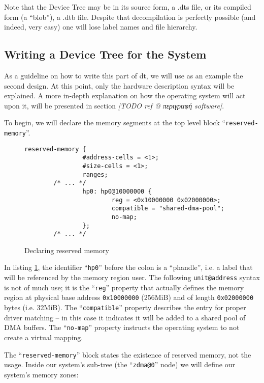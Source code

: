 Note that the Device Tree may be in its source form, 
a .dts file, or its compiled form (a ``blob''), a .dtb file.
Despite that decompilation is perfectly possible (and indeed, very easy)
one will lose label names and file hierarchy.

\subsection{Writing a Device Tree for the System}

As a guideline on how to write this part of \gls{dt}, we will use as an example the second design.
At this point, only the hardware description syntax will be explained.
A more in-depth explanation on how the operating system will act upon it,
will be presented in section \emph{[TODO ref @ περιγραφή software]}.

To begin, we will declare the memory segments at the top level block ``\texttt{reserved-memory}''.

\begin{figure}[ht!]
\centering
\begin{lstlisting}[style=basic]
        reserved-memory {
                #address-cells = <1>;
                #size-cells = <1>;
                ranges;
		/* ... */
                hp0: hp0@10000000 {
                        reg = <0x10000000 0x02000000>;
                        compatible = "shared-dma-pool";
                        no-map;
                };
		/* ... */
\end{lstlisting}
\caption{Declaring reserved memory}
\label{list:resmem}
\end{figure}

In listing \ref{list:resmem}, the identifier ``\texttt{hp0}'' before the colon is a ``phandle'', 
i.e. a label that will be referenced by
the memory region user. The following \texttt{unit@address} syntax is not of much use;
it is the ``\texttt{reg}'' property that actually defines the memory region 
at physical base address \texttt{0x10000000} (256MiB) and of length \texttt{0x02000000} bytes (i.e. 32MiB).
The ``\texttt{compatible}'' property describes the entry for proper driver matching --
in this case it indicates it will be added to a shared pool of DMA buffers.
The ``\texttt{no-map}'' property instructs the operating system to not create a virtual mapping.

The ``\texttt{reserved-memory}'' block states the existence of reserved memory, not the usage.
Inside our system's sub-tree (the ``\texttt{zdma@0}'' node) we will define our system's memory zones:

